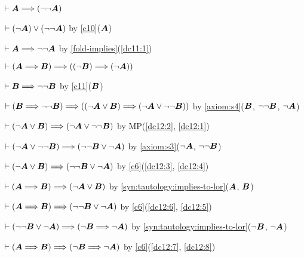 \begin{dc}\label{c11}%
$\vdash\boldsymbol{A}\Longrightarrow(\neg\neg\boldsymbol{A})$
\end{dc}

\begin{pf}
\item\label{dc11:1} $\vdash(\neg\boldsymbol{A})\lor(\neg\neg\boldsymbol{A})$
  by \ref{c10}($\boldsymbol{A}$)
\item $\vdash\boldsymbol{A}\Longrightarrow\neg\neg\boldsymbol{A}$
  by \ref{fold-implies}(\ref{dc11:1})
\end{pf}

\begin{dc}\label{c12}%
$\vdash(\boldsymbol{A}\Longrightarrow\boldsymbol{B})\Longrightarrow((\neg\boldsymbol{B})\Longrightarrow(\neg\boldsymbol{A}))$
\end{dc}

\begin{pf}
\item\label{dc12:1} $\vdash\boldsymbol{B}\Longrightarrow\neg\neg\boldsymbol{B}$
  by \ref{c11}($\boldsymbol{B}$)
\item\label{dc12:2} $\vdash(\boldsymbol{B}\Longrightarrow\neg\neg\boldsymbol{B})\Longrightarrow((\neg\boldsymbol{A}\lor\boldsymbol{B})\Longrightarrow(\neg\boldsymbol{A}\lor\neg\neg\boldsymbol{B}))$
  by \ref{axiom:s4}($\boldsymbol{B}$, $\neg\neg\boldsymbol{B}$, $\neg\boldsymbol{A}$)
\item\label{dc12:3} $\vdash(\neg\boldsymbol{A}\lor\boldsymbol{B})\Longrightarrow(\neg\boldsymbol{A}\lor\neg\neg\boldsymbol{B})$
  by MP(\ref{dc12:2}, \ref{dc12:1})
\item\label{dc12:4} $\vdash(\neg\boldsymbol{A}\lor\neg\neg\boldsymbol{B})\Longrightarrow(\neg\neg\boldsymbol{B}\lor\neg\boldsymbol{A})$
  by \ref{axiom:s3}($\neg\boldsymbol{A}$, $\neg\neg\boldsymbol{B}$)
\item\label{dc12:5} $\vdash(\neg\boldsymbol{A}\lor\boldsymbol{B})\Longrightarrow(\neg\neg\boldsymbol{B}\lor\neg\boldsymbol{A})$
  by \ref{c6}(\ref{dc12:3}, \ref{dc12:4})
\item\label{dc12:6} $\vdash(\boldsymbol{A}\Longrightarrow\boldsymbol{B})\Longrightarrow(\neg\boldsymbol{A}\lor\boldsymbol{B})$
  by \ref{syn:tautology:implies-to-lor}($\boldsymbol{A}$, $\boldsymbol{B}$)
\item\label{dc12:7} $\vdash(\boldsymbol{A}\Longrightarrow\boldsymbol{B})\Longrightarrow(\neg\neg\boldsymbol{B}\lor\neg\boldsymbol{A})$
  by \ref{c6}(\ref{dc12:6}, \ref{dc12:5})
\item\label{dc12:8} $\vdash(\neg\neg\boldsymbol{B}\lor\neg\boldsymbol{A})\Longrightarrow(\neg\boldsymbol{B}\Longrightarrow\neg\boldsymbol{A})$
  by \ref{syn:tautology:implies-to-lor}($\neg\boldsymbol{B}$, $\neg\boldsymbol{A}$)
\item $\vdash(\boldsymbol{A}\Longrightarrow\boldsymbol{B})\Longrightarrow(\neg\boldsymbol{B}\Longrightarrow\neg\boldsymbol{A})$
  by \ref{c6}(\ref{dc12:7}, \ref{dc12:8})
\end{pf}

